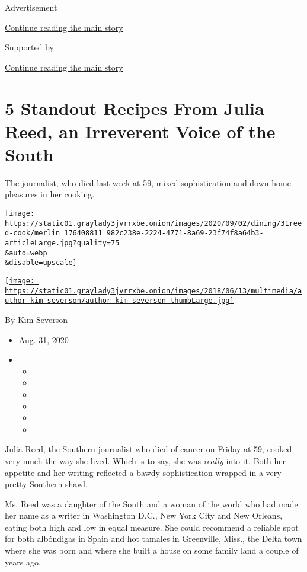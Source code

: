 Advertisement

\protect\hyperlink{after-top}{Continue reading the main story}

Supported by

\protect\hyperlink{after-sponsor}{Continue reading the main story}

\hypertarget{5-standout-recipes-from-julia-reed-an-irreverent-voice-of-the-south}{%
\section{5 Standout Recipes From Julia Reed, an Irreverent Voice of the
South}\label{5-standout-recipes-from-julia-reed-an-irreverent-voice-of-the-south}}

The journalist, who died last week at 59, mixed sophistication and
down-home pleasures in her cooking.

\texttt{[image: https://static01.graylady3jvrrxbe.onion/images/2020/09/02/dining/31reed-cook/merlin\_176408811\_982c238e-2224-4771-8a69-23f74f8a64b3-articleLarge.jpg?quality=75\\\&auto=webp\\\&disable=upscale]}

\href{https://www.nytimes3xbfgragh.onion/by/kim-severson}{\texttt{[image: https://static01.graylady3jvrrxbe.onion/images/2018/06/13/multimedia/author-kim-severson/author-kim-severson-thumbLarge.jpg]}}

By \href{https://www.nytimes3xbfgragh.onion/by/kim-severson}{Kim
Severson}

\begin{itemize}
\item
  Aug. 31, 2020
\item
  \begin{itemize}
  \item
  \item
  \item
  \item
  \item
  \item
  \end{itemize}
\end{itemize}

Julia Reed, the Southern journalist who
\href{https://www.nytimes3xbfgragh.onion/aponline/2020/08/29/us/ap-us-obit-julia-reed.html}{died
of cancer} on Friday at 59, cooked very much the way she lived. Which is
to say, she was \emph{really} into it. Both her appetite and her writing
reflected a bawdy sophistication wrapped in a very pretty Southern
shawl.

Ms. Reed was a daughter of the South and a woman of the world who had
made her name as a writer in Washington D.C., New York City and New
Orleans, eating both high and low in equal measure. She could recommend
a reliable spot for both albóndigas in Spain and hot tamales in
Greenville, Miss., the Delta town where she was born and where she built
a house on some family land a couple of years ago.

